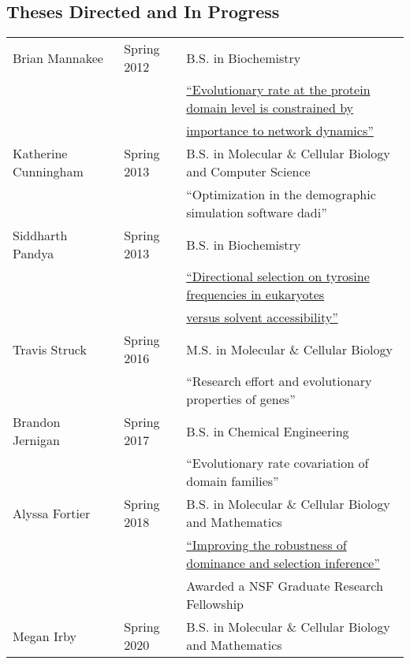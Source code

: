 \documentclass[11pt]{article}
\newcommand{\dadi}{dadi\xspace}
\begin{document}

\subsection*{Theses Directed and In Progress}
\begin{longtable}[l]{l l l}
Brian Mannakee & Spring 2012 & B.S. in Biochemistry\\
 & & \href{http://hdl.handle.net/10150/244452}{``Evolutionary rate at the protein domain level is constrained by}\\
&& \href{http://hdl.handle.net/10150/244452}{importance to network dynamics''}\\
Katherine Cunningham & Spring 2013 & B.S. in Molecular \& Cellular Biology and Computer Science\\
 && ``Optimization in the demographic simulation software  \dadi''\\
 Siddharth Pandya & Spring 2013 & B.S. in Biochemistry\\
 && \href{http://hdl.handle.net/10150/297727}{``Directional selection on tyrosine frequencies in eukaryotes}\\
 &&\href{http://hdl.handle.net/10150/297727}{versus solvent accessibility''}\\
 Travis Struck & Spring 2016 & M.S. in Molecular \& Cellular Biology\\
                    & & ``Research effort and evolutionary properties of genes''\\
Brandon Jernigan & Spring 2017 & B.S. in Chemical Engineering\\
& & ``Evolutionary rate covariation of domain families''\\
Alyssa Fortier & Spring 2018 & B.S. in Molecular \& Cellular Biology and Mathematics\\
&& \href{http://hdl.handle.net/10150/630373}{``Improving the robustness of dominance and selection inference''}\\
&& Awarded a NSF Graduate Research Fellowship\\
Megan Irby & Spring 2020 & B.S. in Molecular \& Cellular Biology and Mathematics\\

\end{longtable}
\end{document}
